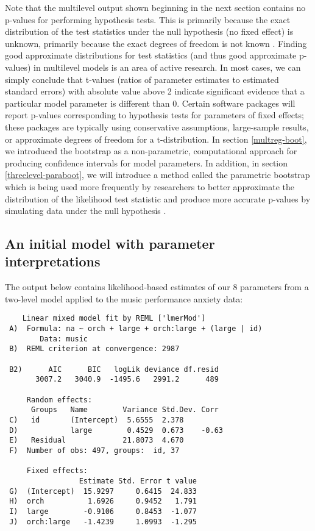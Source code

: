\documentclass[
]{krantz}
\begin{document}
Note that the multilevel output shown beginning in the next section contains no p-values for performing hypothesis tests. This is primarily because the exact distribution of the test statistics under the null hypothesis (no fixed effect) is unknown, primarily because the exact degrees of freedom is not known \citep{Bates2015}. Finding good approximate distributions for test statistics (and thus good approximate p-values) in multilevel models is an area of active research. In most cases, we can simply conclude that t-values (ratios of parameter estimates to estimated standard errors) with absolute value above 2 indicate significant evidence that a particular model parameter is different than 0. Certain software packages will report p-values corresponding to hypothesis tests for parameters of fixed effects; these packages are typically using conservative assumptions, large-sample results, or approximate degrees of freedom for a t-distribution. In section \ref{multreg-boot}, we introduced the bootstrap as a non-parametric, computational approach for producing confidence intervals for model parameters. In addition, in section \ref{threelevel-paraboot}, we will introduce a method called the parametric bootstrap which is being used more frequently by researchers to better approximate the distribution of the likelihood test statistic and produce more accurate p-values by simulating data under the null hypothesis \citep{Efron2012}.

\hypertarget{initialmodel}{%
\subsection{An initial model with parameter interpretations}\label{initialmodel}}

The output below contains likelihood-based estimates of our 8 parameters from a two-level model applied to the music performance anxiety data:

\begin{verbatim}
    Linear mixed model fit by REML ['lmerMod'] 
 A)  Formula: na ~ orch + large + orch:large + (large | id) 
        Data: music 
 B)  REML criterion at convergence: 2987 
      
 B2)      AIC      BIC   logLik deviance df.resid  
       3007.2   3040.9  -1495.6   2991.2      489  
      
     Random effects: 
      Groups   Name        Variance Std.Dev. Corr  
 C)   id       (Intercept)  5.6555  2.378          
 D)            large        0.4529  0.673    -0.63 
 E)   Residual             21.8073  4.670          
 F)  Number of obs: 497, groups:  id, 37 
      
     Fixed effects: 
                 Estimate Std. Error t value 
 G)  (Intercept)  15.9297     0.6415  24.833 
 H)  orch          1.6926     0.9452   1.791 
 I)  large        -0.9106     0.8453  -1.077 
 J)  orch:large   -1.4239     1.0993  -1.295
\end{verbatim}
\end{document}
